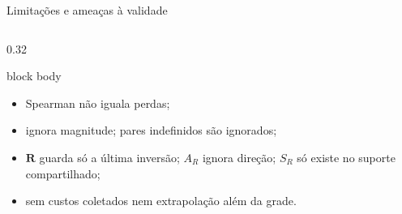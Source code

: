 \begin{frame}{Limitações e ameaças à validade}
\begin{columns}[T,onlytextwidth]
\begin{column}{0.32\textwidth}
\begin{beamercolorbox}[wd=\linewidth,sep=.13cm,rounded=true]{block body}
        \begin{itemize}\setlength{\itemsep}{.03cm}
          \item Spearman não iguala perdas;
          \item \AW{} ignora magnitude; pares indefinidos são ignorados;
          \item $\mathbf R$ guarda só a última inversão; $A_R$ ignora direção; $S_R$ só existe no suporte compartilhado;
          \item sem custos coletados nem extrapolação além da grade.
        \end{itemize}
      \end{beamercolorbox}
    \end{column}
  \end{columns}

  \vspace{0.05cm}
\end{frame}


